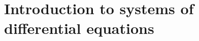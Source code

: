 \documentclass[../main.tex]{subfiles}
\begin{document}
 \section{Introduction to systems of differential equations}
\end{document}
